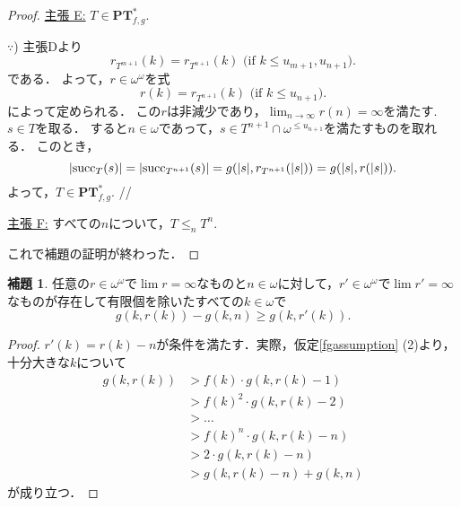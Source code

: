 \documentclass[uplatex]{jsarticle}
\newcommand{\suc}{\operatorname{succ}}
\newcommand{\PTfg}{\mathbf{PT}_{f,g}}
\DeclarePairedDelimiter\abs{\lvert}{\rvert}
\renewcommand\subset{\subseteq}
\theoremstyle{definition}
\newtheorem{lem}[thm]{補題}
\newenvironment{claim}[1]{\par\noindent\underline{主張 #1:}\space}{}
\newenvironment{claimproof}[1]{\par\noindent$\because$) \space#1}{\hfill //}
\begin{document}
\begin{proof}
		\begin{claim}{E}
			$T \in \PTfg^*$.	
		\end{claim}
		\begin{claimproof}
			主張Dより
			\[
			r_{T^{m+1}}(k) = r_{T^{n+1}}(k) \text{ (if $k \le u_{m+1}, u_{n+1}$)}.
			\]
			である．
			よって，$r \in \omega^\omega$を式
			\[
			r(k) = r_{T^{n+1}}(k) \text{ (if $k \le u_{n+1}$)}.
			\]
			によって定められる．
			この$r$は非減少であり，$\lim_{n \to \infty} r(n) = \infty$を満たす.
			$s \in T$を取る．
			すると$n \in \omega$であって，$s \in T^{n+1} \cap \omega^{\le u_{n+1}}$を満たすものを取れる．
			このとき，
			\[
			\abs{\suc_T(s)} = \abs{\suc_{T^{n+1}}(s)} = g(\abs{s}, r_{T^{n+1}}(\abs{s})) = g(\abs{s}, r(\abs{s})).
			\]
			よって，$T \in \PTfg^*$.
		\end{claimproof}
	
		\begin{claim}{F}
			すべての$n$について，$T \le_n T^n$.
		\end{claim}
	
		これで補題の証明が終わった．
		\end{proof}
	
	\begin{lem}\label{shrinkinglemma}
		任意の$r \in \omega^\omega$で$\lim r = \infty$なものと$n \in \omega$に対して，$r' \in \omega^\omega$で$\lim r' = \infty$なものが存在して有限個を除いたすべての$k \in \omega$で
		\[
		g(k, r(k)) - g(k, n) \ge g(k, r'(k)).
		\]
	\end{lem}
	\begin{proof}
		$r'(k) = r(k) - n$が条件を満たす．実際，仮定\ref{fgassumption} (2)より，十分大きな$k$について
		\begin{align*}
			g(k, r(k)) &> f(k) \cdot g(k, r(k) - 1) \\
			&> f(k)^2 \cdot g(k, r(k) - 2) \\
			&> \dots \\
			&> f(k)^n \cdot g(k, r(k) - n) \\
			&> 2 \cdot g(k, r(k) - n) \\
			&> g(k, r(k) - n) + g(k, n)
		\end{align*}
	が成り立つ．
	\end{proof}
		
\end{document}
